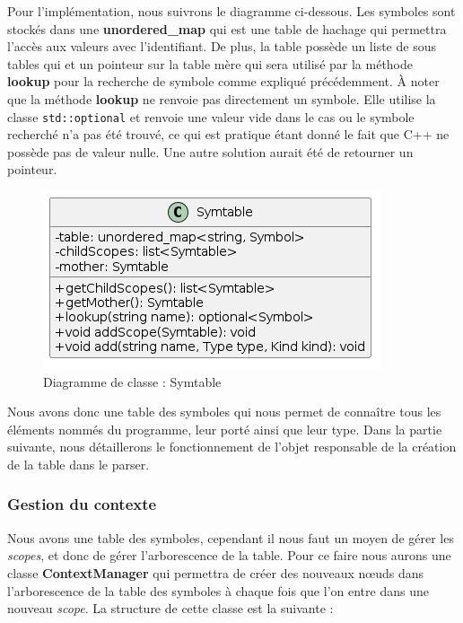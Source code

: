 \documentclass[a4paper]{article}%
\begin{document}
Pour l'implémentation, nous suivrons le diagramme ci-dessous. Les symboles sont
stockés dans une \textbf{unordered\_map} qui est une table de hachage qui
permettra l'accès aux valeurs avec l'identifiant. De plus, la table
possède un liste de sous tables qui et un pointeur sur la table mère qui sera
utilisé par la méthode \textbf{lookup} pour la recherche de symbole comme
expliqué précédemment. À noter que la méthode \textbf{lookup} ne renvoie pas
directement un symbole. Elle utilise la classe \lstinline{std::optional} et
renvoie une valeur vide dans le cas ou le symbole recherché n'a pas été trouvé,
ce qui est pratique étant donné le fait que C++ ne possède pas de valeur nulle.
Une autre solution aurait été de retourner un pointeur.

\begin{figure}[h!]
  \begin{center}
  \includegraphics[scale=0.5]{../ressources/diagrams/symtable2.png}
  \caption{Diagramme de classe : Symtable}
  \end{center}
\end{figure}

Nous avons donc une table des symboles qui nous permet de connaître tous les
éléments nommés du programme, leur porté ainsi que leur type. Dans la partie
suivante, nous détaillerons le fonctionnement de l'objet responsable de la
création de la table dans le \gls{parser}.

\clearpage
\subsubsection*{Gestion du contexte}

Nous avons une table des symboles, cependant il nous faut un moyen de gérer les
\textit{scopes}, et donc de gérer l'arborescence de la table. Pour ce faire nous
aurons une classe \textbf{ContextManager} qui permettra de créer des nouveaux
nœuds dans l'arborescence de la table des symboles à chaque fois que l'on entre
dans une nouveau \textit{scope}. La structure de cette classe est la suivante :
\end{document}
